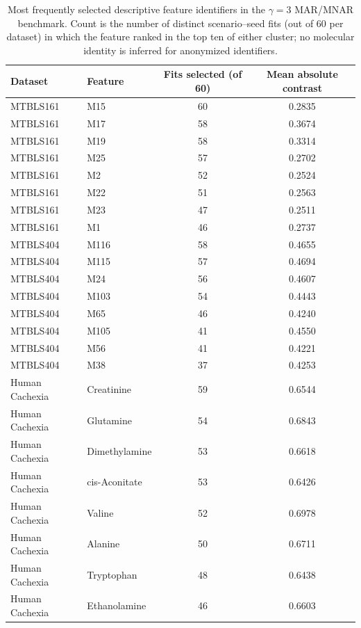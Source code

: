 \begin{table}[t]
\centering
\caption{Most frequently selected descriptive feature identifiers in the $\gamma=3$ MAR/MNAR benchmark. Count is the number of distinct scenario--seed fits (out of 60 per dataset) in which the feature ranked in the top ten of either cluster; no molecular identity is inferred for anonymized identifiers.}
\label{tab:supp_features}
\small
\begin{tabular}{llcc}
\toprule
Dataset & Feature & Fits selected (of 60) & Mean absolute contrast \\
\midrule
MTBLS161 & M15 & 60 & 0.2835 \\
MTBLS161 & M17 & 58 & 0.3674 \\
MTBLS161 & M19 & 58 & 0.3314 \\
MTBLS161 & M25 & 57 & 0.2702 \\
MTBLS161 & M2 & 52 & 0.2524 \\
MTBLS161 & M22 & 51 & 0.2563 \\
MTBLS161 & M23 & 47 & 0.2511 \\
MTBLS161 & M1 & 46 & 0.2737 \\
\addlinespace[3pt]
MTBLS404 & M116 & 58 & 0.4655 \\
MTBLS404 & M115 & 57 & 0.4694 \\
MTBLS404 & M24 & 56 & 0.4607 \\
MTBLS404 & M103 & 54 & 0.4443 \\
MTBLS404 & M65 & 46 & 0.4240 \\
MTBLS404 & M105 & 41 & 0.4550 \\
MTBLS404 & M56 & 41 & 0.4221 \\
MTBLS404 & M38 & 37 & 0.4253 \\
\addlinespace[3pt]
Human Cachexia & Creatinine & 59 & 0.6544 \\
Human Cachexia & Glutamine & 54 & 0.6843 \\
Human Cachexia & Dimethylamine & 53 & 0.6618 \\
Human Cachexia & cis-Aconitate & 53 & 0.6426 \\
Human Cachexia & Valine & 52 & 0.6978 \\
Human Cachexia & Alanine & 50 & 0.6711 \\
Human Cachexia & Tryptophan & 48 & 0.6438 \\
Human Cachexia & Ethanolamine & 46 & 0.6603 \\
\bottomrule
\end{tabular}
\end{table}

